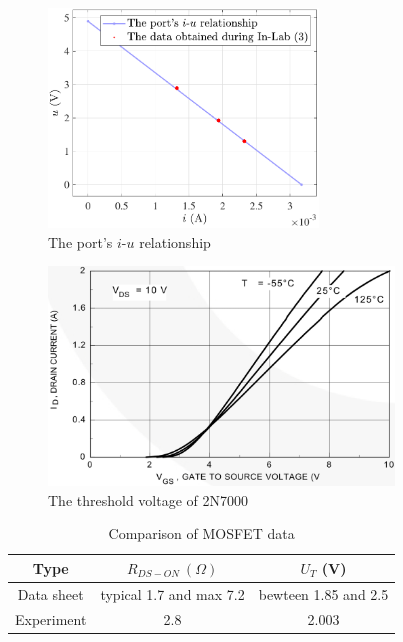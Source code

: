 \documentclass[UTF8]{report}
\theoremstyle{MyLineTheoremStyle} %
\theoremstyle{MyBlockTheoremStyle} %
\theoremstyle{MySubsubsectionStyle} %
\begin{document}
\begin{center}\noindent\begin{minipage}{0.42\columnwidth}
\begin{figure}[H]\centering
    \includegraphics[height=165pt]{assets/Lab1/2024-10-18_20-04-11.pdf}
    \caption{The port's $i$-$u$ relationship}
    \label{The port's iu relationship}
\end{figure}
\end{minipage}\hfill\begin{minipage}{0.58\columnwidth}
\begin{figure}[H]\centering
    \includegraphics[height=165pt]{assets/Lab1/1dde8392e5bc21535aa77c1f94219773.png}
    \caption{The threshold voltage of 2N7000}
    \label{The threshold voltage of 2N7000}
\end{figure}
\end{minipage}\end{center}


\begin{table}[H]\centering
    \caption{Comparison of MOSFET data}
    \label{Comparison of MOSFET data}
\begin{tabular}{ccc}\hline
    Type & $R_{DS-ON} \ (\Omega)$ & $U_T$ (V) \\
    \hline
    Data sheet & typical 1.7 and max 7.2 & bewteen 1.85 and 2.5 \\
    Experiment & 2.8 & 2.003 \\
    \hline
\end{tabular}
\end{table}
\end{document}
